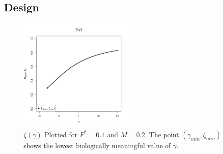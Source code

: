 %
\subsection{Design \label{sLHS}}

%
\begin{figure}
\includegraphics[width=0.5\textwidth]{../gpBias/zeta.png}
\vspace*{-1.3cm}
\caption{$\zeta(\gamma)$ Plotted for $F^*=0.1$ and $M=0.2$. The point
$(\gamma_{min}, \zeta_{min})$ shows the lowest biologically meaningful
value of $\gamma$.} %
\end{figure}



